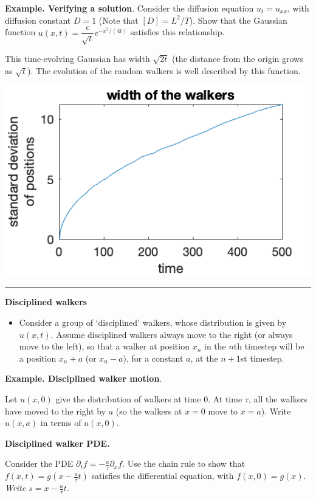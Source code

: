 \documentclass[12pt,letterpaper,noanswers]{exam}
\begin{document}
\noindent\textbf{Example.  Verifying a solution}.  Consider the diffusion equation $\displaystyle u_t = u_{xx}$, with diffusion constant $D = 1$ (Note that $[D] = L^2/T$).  Show that the Gaussian function $\displaystyle u(x,t) = \dfrac{c}{\sqrt{t}}e^{-x^2/(4t)}$ satisfies this relationship.

\vspace{2.5in}

This time-evolving Gaussian has width $\sqrt{2t}$ (the distance from the origin grows as $\sqrt{t}$).  The evolution of the random walkers is well described by this function.  

\includegraphics[width=0.5\linewidth]{img/C36p2.png}

    

\vspace{0.2cm}
\hrule
\vspace{0.2cm}

\eject

\noindent\textbf{Disciplined walkers}
\begin{tcolorbox}
\begin{itemize}
\itemsep0em
    \item Consider a group of `disciplined' walkers, whose distribution is given by $u(x,t)$.  Assume disciplined walkers always move to the right (or always move to the left), so that a walker at position $x_n$ in the $n$th timestep will be a position $x_n + a$ (or $x_n - a$), for a constant $a$, at the $n+1$st timestep.
\end{itemize}
\end{tcolorbox}
\noindent\textbf{Example.  Disciplined walker motion}.

Let $u(x,0)$ give the distribution of walkers at time $0$.  At time $\tau$, all the walkers have moved to the right by $a$ (so the walkers at $x=0$ move to $x=a$).  Write $u(x,a)$ in terms of $u(x,0)$.

\vspace{1in}

\noindent\textbf{Disciplined walker PDE.}

Consider the PDE $\partial_t f = -\frac{a}{\tau}\partial_x f$.  Use the chain rule to show that $f(x,t) = g\left(x - \frac{a}{\tau} t\right)$ satisfies the differential equation, with $f(x,0) = g(x)$.  \emph{Write $s = x - \frac{a}{\tau} t$.}
\end{document}
